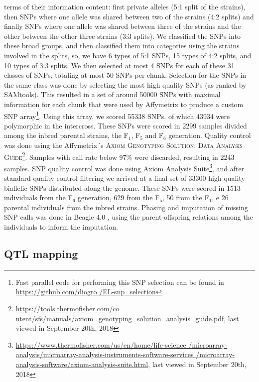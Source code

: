 \begin{refsection}
terms of their information content: first private alleles (5:1 split of the
strains), then SNPs where one allele was shared between two of the strains
(4:2 splits) and finally SNPs where one allele was shared between three of the
strains and the other between the other three strains (3:3 splits). We
classified the SNPs into these broad groups, and then classified them into
categories using the strains involved in the splits, so, we have 6 types of
5:1 SNPs, 15 types of 4:2 splits, and 10 types of 3:3 splits. We then selected
at most 4 SNPs for each of these 31 classes of SNPs, totaling at most 50 SNPs
per chunk. Selection for the SNPs in the same class was done by selecting the
most high quality SNPs (as ranked by SAMtools). This resulted in a set of
around 50000 SNPs with maximal information for each chunk that were used by
Affymetrix to produce a custom SNP array\footnote{Fast parallel code for
performing this SNP selection can be found in \url{https://github.com/diogro
/EL-snp_selection}}. Using this array, we scored 55338 SNPs, of which 43934
were polymorphic in the intercross. These SNPs were scored in 2299 samples
divided among the inbred parental strains, the F$_{\text{1}}$, F$_{\text{5}}$
and F$_{\text{6}}$ generation. Quality control was done using the Affymetrix´s
\textsc{Axiom Genotyping Solution: Data Analysis
Guide}\footnote{\url{https://tools.thermofisher.com/co
ntent/sfs/manuals/axiom_genotyping_solution_analysis_guide.pdf}, last viewed
in September 20th, 2018}. Samples with call rate below 97\% were discarded,
resulting in 2243 samples. SNP quality control was done using Axiom Analysis
Suite\footnote{\url{https://www.thermofisher.com/us/en/home/life-science
/microarray-analysis/microarray-analysis-instruments-software-services
/microarray-analysis-software/axiom-analysis-suite.html}, last viewed in
September 20th, 2018}, and after standard quality control filtering we arrived
at a final set of 33300 high quality biallelic SNPs distributed along the
genome. These SNPs were scored in 1513 individuals from the F$_{\text{6}}$
generation, 629 from the F$_{\text{5}}$, 50 from the F$_{\text{1}}$, e 26
parental individuals from the inbred strains. Phasing and imputation of
missing SNP calls was done in Beagle 4.0 \parencite{Browning2007-el}, using
the parent-offspring relations among the individuals to inform the imputation.

\subsection{QTL mapping}


\end{refsection}
